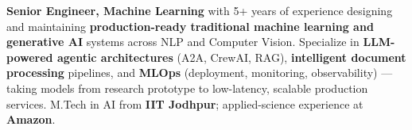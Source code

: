 \documentclass[letter,10pt]{article}
\begin{document}

\textbf{Senior Engineer, Machine Learning} with 5+ years of experience designing and maintaining \textbf{production-ready traditional machine learning and generative AI} systems across NLP and Computer Vision.
Specialize in \textbf{LLM-powered agentic architectures} (A2A, CrewAI, RAG), \textbf{intelligent document processing} pipelines, and \textbf{MLOps} (deployment, monitoring, observability) — taking models from research prototype to low-latency, scalable production services.
M.Tech in AI from \textbf{IIT Jodhpur}; applied-science experience at \textbf{Amazon}.
\end{document}
